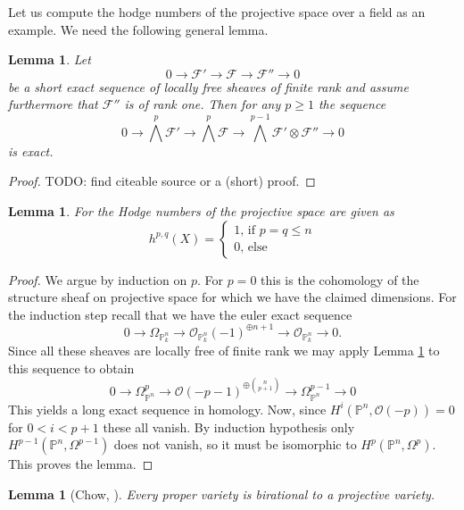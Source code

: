 \documentclass[11pt, a4paper, german]{article}
\theoremstyle{plain}
\newtheorem{lemma}[theorem]{Lemma}
\theoremstyle{definition}
\begin{document}
Let us compute the hodge numbers of the projective space over a field as an example.
We need the following general lemma.

\begin{lemma}
    \label{ses}
    Let 
    \[
        0 \to \mathcal{F}' \to \mathcal{F} \to \mathcal{F}'' \to 0
    \]
    be a short exact sequence of locally free sheaves of finite rank and assume furthermore that $\mathcal{F}''$ is of rank one.
    Then for any $p \ge 1$ the sequence
    \[
        0 \to {\bigwedge}^p \mathcal{F}' \to {\bigwedge}^p \mathcal{F} \to {\bigwedge}^{p-1} \mathcal{F}' \otimes \mathcal{F}'' \to 0
    \]
    is exact.
\end{lemma}
\begin{proof}
    TODO: find citeable source or a (short) proof.
\end{proof}

\begin{lemma}
    For the Hodge numbers of the projective space are given as
    \[
        h^{p,q}(X) = 
        \begin{cases}
            1 \text{, if $p = q \leq n$}\\
            0 \text{, else}
        \end{cases}
    \]
\end{lemma}
\begin{proof}
    We argue by induction on $p$. 
    For $p = 0$ this is the cohomology of the structure sheaf on projective space for which we have the claimed dimensions.
    For the induction step recall that we have the euler exact sequence 
    \[0 \to \Omega_{\mathbb{P}_k^n} \to {\mathcal{O}_{\mathbb{P}_k^n}(-1)}^{\oplus n+1} \to \mathcal{O}_{\mathbb{P}_k^n} \to 0 .\]
    Since all these sheaves are locally free of finite rank we may apply Lemma \ref{ses} to this sequence to obtain
    \[
        0 \to \Omega_{\mathbb{P}^n}^p \to {\mathcal{O}(-p-1)}^{\oplus \binom{n}{p+1}} \to \Omega_{\mathbb{P}^n}^{p-1} \to 0
    \]
    This yields a long exact sequence in homology. Now, since $H^i(\mathbb{P}^n, \mathcal{O}(-p)) = 0$ for $0 < i < p+1$ these all vanish.
    By induction hypothesis only $H^{p-1}(\mathbb{P}^n, \Omega^{p-1})$ does not vanish, so it must be isomorphic to 
    $H^{p}(\mathbb{P}^n, \Omega^p)$. This proves the lemma.
\end{proof}
\begin{lemma}[Chow, {\cite[II Ex. 4.10]{Ha}}]
    Every proper variety is birational to a projective variety.
\end{lemma}
\end{document}
